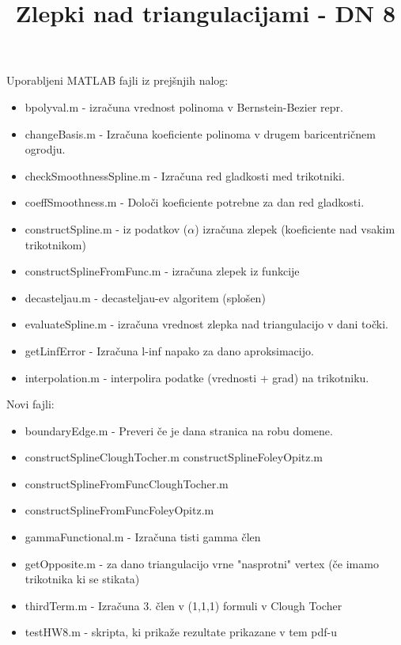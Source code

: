 \documentclass{article}
\begin{document}
\title{Zlepki nad triangulacijami - DN 8}
\maketitle

Uporabljeni MATLAB fajli iz prejšnjih nalog:
\begin{itemize}
\item bpolyval.m - izračuna vrednost polinoma v Bernstein-Bezier repr.
\item changeBasis.m - Izračuna koeficiente polinoma v drugem baricentričnem ogrodju.
\item checkSmoothnessSpline.m - Izračuna red gladkosti med trikotniki.
\item coeffSmoothness.m - Določi koeficiente potrebne za dan red gladkosti.
\item constructSpline.m - iz podatkov ($\alpha$) izračuna zlepek (koeficiente nad vsakim trikotnikom)
\item constructSplineFromFunc.m - izračuna zlepek iz funkcije
\item decasteljau.m - decasteljau-ev algoritem (splošen)
\item evaluateSpline.m - izračuna vrednost zlepka nad triangulacijo v dani točki.
\item getLinfError - Izračuna l-inf napako za dano aproksimacijo.
\item interpolation.m - interpolira podatke (vrednosti + grad) na trikotniku.
\end{itemize}

Novi fajli:
\begin{itemize}
\item boundaryEdge.m - Preveri če je dana stranica na robu domene.
\item constructSplineCloughTocher.m
\tiem constructSplineFoleyOpitz.m
\item constructSplineFromFuncCloughTocher.m
\item constructSplineFromFuncFoleyOpitz.m
\item gammaFunctional.m - Izračuna tisti gamma člen
\item getOpposite.m - za dano triangulacijo vrne "nasprotni" vertex (če imamo trikotnika ki se stikata)
\item thirdTerm.m - Izračuna 3. člen v (1,1,1) formuli v Clough Tocher
\item testHW8.m - skripta, ki prikaže rezultate prikazane v tem pdf-u
\end{itemize}
\end{document}
